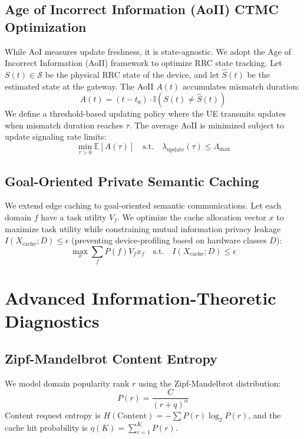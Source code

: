 \documentclass[journal]{IEEEtran}
\begin{document}
\subsection{Age of Incorrect Information (AoII) CTMC Optimization}
While AoI measures update freshness, it is state-agnostic. We adopt the Age of Incorrect Information (AoII) framework to optimize RRC state tracking. Let $S(t) \in \mathcal{S}$ be the physical RRC state of the device, and let $\hat{S}(t)$ be the estimated state at the gateway. The AoII $A(t)$ accumulates mismatch duration:
\begin{equation}
A(t) = (t - t_0) \cdot \mathbb{I}(S(t) \neq \hat{S}(t))
\end{equation}
We define a threshold-based updating policy where the UE transmits updates when mismatch duration reaches $\tau$. The average AoII is minimized subject to update signaling rate limits:
\begin{equation}
\min_{\tau > 0} \mathbb{E}[A(\tau)] \quad \text{s.t.} \quad \lambda_{\text{update}}(\tau) \leq \Lambda_{\text{max}}
\end{equation}

\subsection{Goal-Oriented Private Semantic Caching}
We extend edge caching to goal-oriented semantic communications. Let each domain $f$ have a task utility $V_f$. We optimize the cache allocation vector $x$ to maximize task utility while constraining mutual information privacy leakage $I(X_{\text{cache}}; D) \leq \epsilon$ (preventing device-profiling based on hardware classes $D$):
\begin{equation}
\max_{x} \sum_{f} P(f) V_f x_f \quad \text{s.t.} \quad I(X_{\text{cache}}; D) \leq \epsilon
\end{equation}

\section{Advanced Information-Theoretic Diagnostics}

\subsection{Zipf-Mandelbrot Content Entropy}
We model domain popularity rank $r$ using the Zipf-Mandelbrot distribution:
\begin{equation}
P(r) = \frac{C}{(r + q)^\alpha}
\end{equation}
Content request entropy is $H(\text{Content}) = -\sum P(r) \log_2 P(r)$, and the cache hit probability is $\eta(K) = \sum_{r=1}^K P(r)$.
\end{document}
